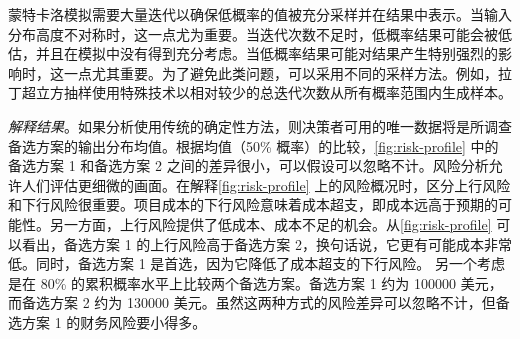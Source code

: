 蒙特卡洛模拟需要大量迭代以确保低概率的值被充分采样并在结果中表示。当输入分布高度不对称时，这一点尤为重要。当迭代次数不足时，低概率结果可能会被低估，并且在模拟中没有得到充分考虑。当低概率结果可能对结果产生特别强烈的影响时，这一点尤其重要。为了避免此类问题，可以采用不同的采样方法。例如，拉丁超立方抽样使用特殊技术以相对较少的总迭代次数从所有概率范围内生成样本。

\emph{解释结果}。如果分析使用传统的确定性方法，则决策者可用的唯一数据将是所调查备选方案的输出分布均值。根据均值（50\% 概率）的比较，\cref{fig:risk-profile} 中的备选方案 1 和备选方案 2 之间的差异很小，可以假设可以忽略不计。风险分析允许人们评估更细微的画面。在解释\cref{fig:risk-profile} 上的风险概况时，区分上行风险和下行风险很重要。项目成本的下行风险意味着成本超支，即成本远高于预期的可能性。另一方面，上行风险提供了低成本、成本不足的机会。从\cref{fig:risk-profile} 可以看出，备选方案 1 的上行风险高于备选方案 2，换句话说，它更有可能成本非常低。同时，备选方案 1 是首选，因为它降低了成本超支的下行风险。 另一个考虑是在 80\% 的累积概率水平上比较两个备选方案。备选方案 1 约为 \num{100000} 美元，而备选方案 2 约为 \num{130000} 美元。虽然这两种方式的风险差异可以忽略不计，但备选方案 1 的财务风险要小得多。

